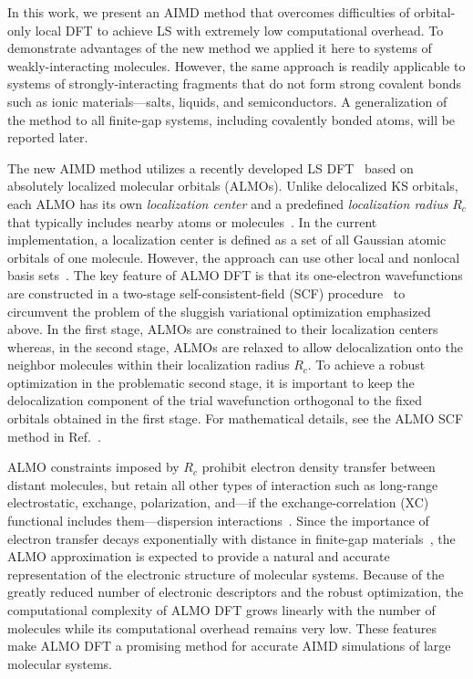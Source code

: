 \documentclass[aps,prl,reprint,amsmath,amssymb]{revtex4-1}
\begin{document}
In this work, we present an AIMD method that overcomes difficulties of orbital-only local DFT to achieve LS with extremely low computational overhead. 
To demonstrate advantages of the new method we applied it here to systems of weakly-interacting molecules. 
However, the same approach is readily applicable to systems of strongly-interacting fragments that do not form strong covalent bonds such as ionic materials---salts, liquids, and semiconductors. 
A generalization of the method to all finite-gap systems, including covalently bonded atoms, will be reported later. 

The new AIMD method utilizes a recently developed LS DFT~\cite{a:almo-ls} based on absolutely localized molecular orbitals (\mbox{ALMOs}). 
Unlike delocalized KS orbitals, each \mbox{ALMO} has its own \emph{localization center} and a predefined \emph{localization radius} $R_{c}$ that typically includes nearby atoms or molecules~\cite{a:stoll,a:almo-ls}. 
In the current implementation, a localization center is defined as a set of all Gaussian atomic orbitals of one molecule. 
However, the approach can use other local and nonlocal basis sets~\cite{a:galli_loc, Lin2012}. 
The key feature of ALMO DFT is that its one-electron wavefunctions are constructed in a two-stage self-consistent-field (SCF) procedure~\cite{a:almo-ls} to circumvent the problem of the sluggish variational optimization emphasized above. 
In the first stage, ALMOs are constrained to their localization centers~\cite{a:khal} whereas, in the second stage, ALMOs are relaxed to allow delocalization onto the neighbor molecules within their localization radius $R_{c}$. 
To achieve a robust optimization in the problematic second stage, it is important to keep the delocalization component of the trial wavefunction orthogonal to the fixed orbitals obtained in the first stage. 
For mathematical details, see the ALMO SCF method in Ref.~.

ALMO constraints imposed by $R_c$ prohibit electron density transfer between distant molecules, but retain all other types of interaction such as long-range electrostatic, exchange, polarization, and---if the exchange-correlation (XC) functional includes them---dispersion interactions~\cite{a:theeda}. 
Since the importance of electron transfer decays exponentially with distance in finite-gap materials~\cite{a:ls-rev-1999}, the \mbox{ALMO} approximation is expected to provide a natural and accurate representation of the electronic structure of molecular systems. %
Because of the greatly reduced number of electronic descriptors and the robust optimization, the computational complexity of ALMO DFT grows linearly with the number of molecules while its computational overhead remains very low. These features make ALMO DFT a promising method for accurate AIMD simulations of large molecular systems.
\end{document}
